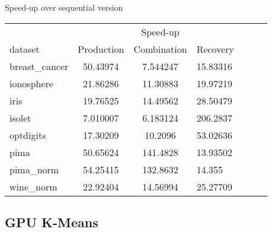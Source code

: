 \begin{frame}{Speed-up over sequential version}

\centering
\scriptsize

\begin{tabular}{lccllll}
\toprule
        &            & Speed-up    & \\
dataset & Production & Combination & Recovery \\
\midrule
breast\_cancer &     50.43974 &   7.544247 &        15.83316 \\
ionosphere    &      21.86286 &   11.30883 &        19.97219 \\
iris          &     19.76525 &   14.49562 &        28.50479 \\
isolet        &    7.010007 &   6.183124 &        206.2837 \\
optdigits     &   17.30209 &    10.2096 &        53.02636 \\
pima          &     50.65624 &   141.4828 &        13.93502 \\
pima\_norm     &     54.25415 &   132.8632 &          14.355 \\
wine\_norm     &      22.92404 &   14.56994 &        25.27709 \\
\bottomrule
\end{tabular}

\end{frame}


\subsection{GPU K-Means}

\begin{frame}{GPU K-Means}

\begin{center}
  \texttt{[image: \{\{2\_0]}}}
\end{center}

\end{frame}


\begin{frame}{GPU K-Means}

\begin{center}
  \texttt{[image: \{\{200\_0]}}}
\end{center}

\end{frame}


